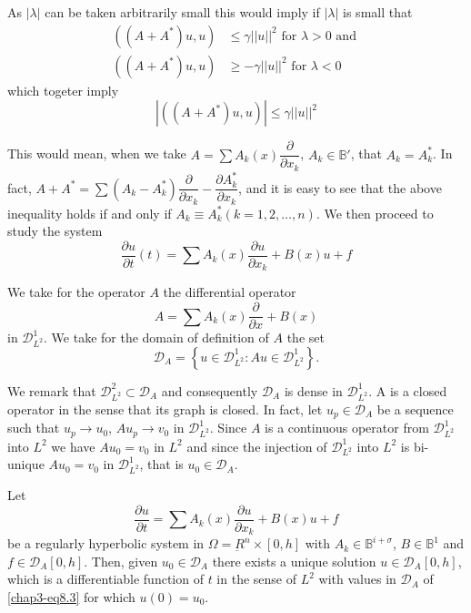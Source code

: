 As $|\lambda|$ can be taken arbitrarily small this would imply if $|
\lambda |$ is small that  
\begin{align*}
(( A + A^*) u, u)  & \leq \gamma || u ||^2 \text{ for } \lambda > 0
  \text{ and }\\ 
(( A + A^*) u, u) & \geq - \gamma || u ||^2 \text{ for } \lambda < 0 
\end{align*}
which togeter imply 
$$
|(( A + A^*) u, u)| \leq \gamma || u ||^2 
$$

This would mean, when we take $A = \sum A_k (x)
\dfrac{\partial}{\partial x_k}$, $A_k \in \mathbb{B}'$, that $A_k =
A^*_k$. In fact, $A + A^* = \sum (A_k - A^*_k)
\dfrac{\partial}{\partial x_k}- \dfrac{\partial A^*_k}{\partial x_k}$,
and it is easy to see that the above inequality holds if and only if
$A_k \equiv A^*_k (k = 1, 2, \ldots, n)$. We then proceed to study the
system  
\begin{equation*}
\frac{\partial u}{\partial t}(t) = \sum A_k (x) \frac{\partial u
}{\partial x_k} + B(x) u + f \tag{8.3} \label{chap3-eq8.3}
\end{equation*}

We take for the operator $A$ the differential operator 
\begin{equation*}
A = \sum A_k (x) \frac{\partial}{\partial x} + B(x)
\tag{8.4}\label{chap3-eq8.4} 
\end{equation*}\pageoriginale
in $\mathscr{D}^1_{L^2}$. We take for the domain of definition of $A$
the set  
\begin{equation*}
\mathscr{D}_A = \left\{ u \in \mathscr{D}^1_{L^2} : A u \in
\mathscr{D}^1_{L^2} \right\}. \tag{8.5} \label{chap3-eq8.5}
\end{equation*}

We remark that $\mathscr{D}^2_{L^2} \subset \mathscr{D}_A$ and
consequently $\mathscr{D}_A$ is dense in $\mathscr{D}^1_{L^2}$. A is a
closed operator in the sense that its graph is closed. In fact, let
$u_p \in \mathscr{D}_A$ be a sequence such that $u_p \to u_0$, $Au_p
\to v_0$ in $\mathscr{D}^1_{L^2}$. Since $A$ is a continuous operator
from $\mathscr{D}^1_{L^2}$ into $L^2$ we have $Au_0 = v_0$ in $L^2$
and since the injection of $\mathscr{D}^1_{L^2}$ into $L^2$ is
bi-unique $Au_0 = v_0$ in $\mathscr{D}^1_{L^2}$, that is $u_0 \in
\mathscr{D}_A$. 

\setcounter{proposition}{0}
\begin{proposition}\label{chap3-sec8-prop1}%
Let
\begin{equation*}
\frac{\partial u}{\partial t} = \sum A_k (x) \frac{\partial
  u}{\partial x_k} + B(x) u + f \tag{8.3}\label{chap3-eq8.3} 
\end{equation*}
be a regularly hyperbolic system in $\Omega = \underbar{R}^n \times [
  0, h]$ with $A_k \in \mathbb{B}^{i + \sigma}$, $B \in
\mathbb{B}^1$ and $f \in \mathscr{D}_A [ 0, h ]$. Then, given $u_0 \in
\mathscr{D}_A$ there exists a unique solution $u \in \mathscr{D}_A [0,
  h]$, which is a differentiable function of $t$ in the sense of $L^2$
with values in $\mathscr{D}_A$  of \eqref{chap3-eq8.3} for which $u (0) = u_0$. 
\end{proposition}

